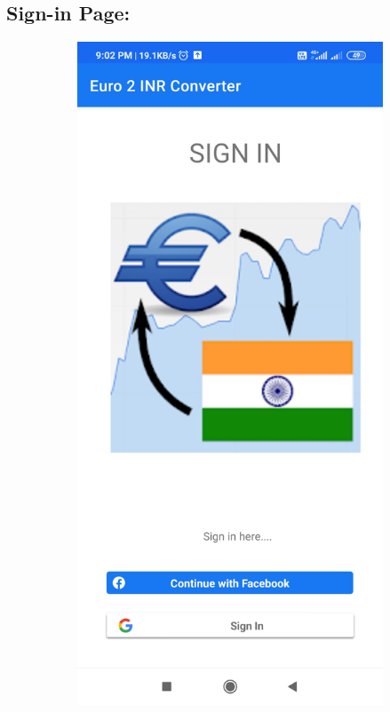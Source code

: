 \documentclass[12pt]{article}
\begin{document}
\subsection{Sign-in Page:}
\begin{figure}[h]
\centering
\begin{subfigure}[h]{0.3\textwidth}
\centering
\includegraphics[scale=0.065]{146977676-a6f3eeb2-a4ef-4b31-bdde-234db3f75de1.jpg}

\end{subfigure}
\end{figure}
\end{document}
